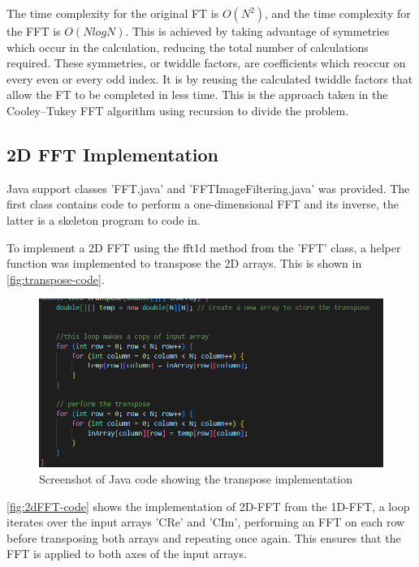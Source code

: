 The time complexity for the original FT is $O(N^2)$, and the time complexity for the FFT is $O(N log N)$.
This is achieved by taking advantage of symmetries which occur in the calculation, reducing the total number of calculations required. These symmetries, or twiddle factors, are coefficients which reoccur on every even or every odd index. It is by reusing the calculated twiddle factors that allow the FT to be completed in less time. This is the approach taken in the  Cooley–Tukey FFT algorithm using recursion to divide the problem.

\subsection{2D FFT Implementation}

Java support classes 'FFT.java' and 'FFTImageFiltering.java' was provided. The first class contains code to perform a one-dimensional FFT and its inverse, the latter is a skeleton program to code in. 

To implement a 2D FFT using the fft1d method from the 'FFT' class, a helper function was implemented to transpose the 2D arrays. This is shown in \autoref{fig:transpose-code}. 

    \begin{figure}[H] 
        \centering
        \includegraphics[width=0.8\columnwidth]{Figures/Week 2/Transpose Implementation.png}
        \caption{Screenshot of Java code showing the transpose implementation}
        \label{fig:transpose-code}
    \end{figure}

\autoref{fig:2dFFT-code} shows the implementation of 2D-FFT from the 1D-FFT, a loop iterates over the input arrays 'CRe' and 'CIm', performing an FFT on each row before transposing both arrays and repeating once again. This ensures that the FFT is applied to both axes of the input arrays.

